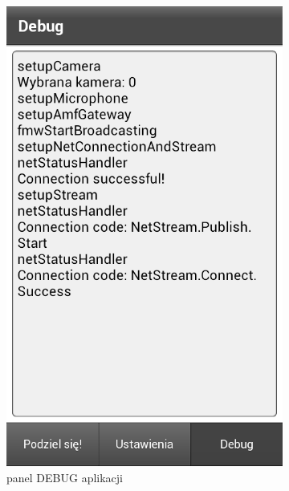 \begin{figure}[h]
        \centering
        \begin{subfigure}[b]{0.3\textwidth}
                \centering
                \includegraphics[width=\textwidth]{img/screens/mobile_broadcaster/panel-debug.png}
                \caption{panel DEBUG aplikacji}
        \end{subfigure}%
        ~ %
        \begin{subfigure}[b]{0.3\textwidth}

\end{subfigure}
\end{figure}
